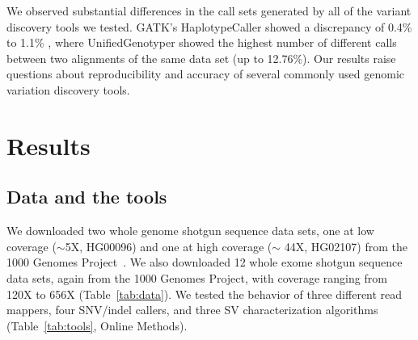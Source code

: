 \documentclass[10pt,a4paper]{article}
\begin{document}
We observed substantial differences in the call sets generated by all of the variant discovery tools we tested. GATK's HaplotypeCaller showed a discrepancy of 0.4\% to 1.1\% , 
where UnifiedGenotyper showed the highest number of different calls between two alignments of the same data set (up to 12.76\%). 
Our results raise questions about reproducibility and accuracy of several commonly used genomic variation discovery tools. 




\section*{Results}

\subsection*{Data and the tools}
We downloaded two whole genome shotgun sequence data sets, one at low coverage ($\sim$5X, HG00096) and one at high coverage ($\sim$ 44X, HG02107) from the 1000 Genomes Project~\cite{1000GP2012}.
We also downloaded 12 whole exome shotgun sequence data sets, again from the 1000 Genomes Project, with coverage ranging from 120X to 656X (Table~\ref{tab:data}). We tested the behavior of 
three different read mappers, four SNV/indel callers, and three SV characterization algorithms (Table~\ref{tab:tools}, Online Methods).
\end{document}
